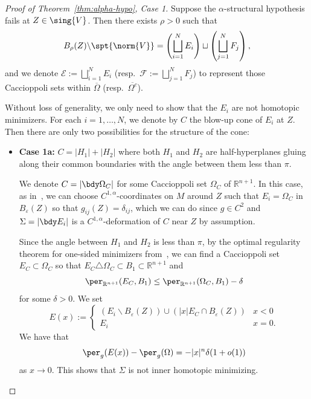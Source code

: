 \begin{proof}[Proof of Theorem~\ref{thm:alpha-hypo}, Case 1]
Suppose the $\alpha$-structural hypothesis fails at $Z \in \sing{V}$. Then there exists $\rho > 0$ such that
\begin{equation}
    B_\rho(Z)\backslash\spt{\norm{V}} = \left(\bigsqcup_{i=1}^NE_i\right)\sqcup\left(\bigsqcup_{j=1}^NF_j\right),
\end{equation}
and we denote $\mathcal{E}:= \bigsqcup_{i=1}^NE_i$ (resp.\ $\mathcal{F}:= \bigsqcup_{j=1}^NF_j$) to represent those
Caccioppoli sets within $\overline{\Omega}$ (resp.\ $\overline{\Omega^c}$).

Without loss of generality, we only need to show that the $E_i$ are not homotopic minimizers. For each $i = 1, \dots, N$,
we denote by $C$ the blow-up cone of $E_i$ at $Z$. Then there are only two possibilities for the structure of the cone:

\begin{itemize}
    \item \textbf{Case 1a:} $C = |H_1|+|H_2|$ where both $H_1$ and $H_2$ are half-hyperplanes gluing along their
    common boundaries with the angle between them less than $\pi$.

    We denote $C = |\bdy\Omega_C|$ for some Caccioppoli set $\Omega_C$ of $\mathbb{R}^{n + 1}$. In this case, as
    in~\cite[Lemma 3.4]{CLS22}, we can choose $C^{1, \alpha}$-coordinates on $M$ around $Z$ such that $E_i = \Omega_C$
    in $B_\varepsilon(Z)$ so that $g_{ij}(Z) = \delta_{ij}$, which we can do since $g \in C^2$ and $\Sigma = |\bdy E_i|$
    is a $C^{1, \alpha}$-deformation of $C$ near $Z$ by assumption.

    Since the angle between $H_1$ and $H_2$ is less than $\pi$, by the optimal regularity theorem for one-sided
    minimizers from~\cite{Liu19}, we can find a Caccioppoli set $E_C \subset \Omega_C$ so that
    $E_C\triangle \Omega_C\subset B_1 \subset \mathbb{R}^{n + 1}$ and
    \begin{equation}
        \per_{\mathbb{R}^{n + 1}}(E_C, B_1) \leq \per_{\mathbb{R}^{n + 1}}(\Omega_C, B_1) - \delta
    \end{equation}
    for some $\delta > 0$. We set
    \begin{equation}
        E(x) := \begin{cases}
            (E_i\backslash B_\varepsilon(Z))\cup(|x|E_C\cap B_\varepsilon(Z)) & x < 0\\
            E_i & x = 0.
        \end{cases}
    \end{equation}
    We have that
    \begin{equation}
        \per_g(E(x)) - \per_g(\Omega) = -|x|^n\delta(1 + o(1))
    \end{equation}
    as $x \to 0$. This shows that $\Sigma$ is not inner homotopic minimizing.


\end{itemize}
\end{proof}
